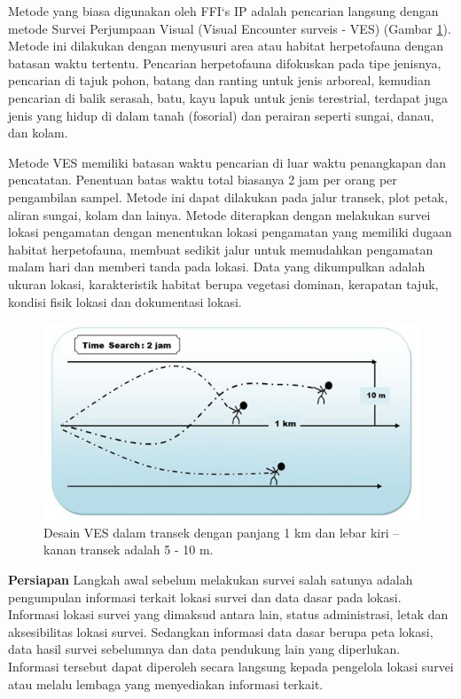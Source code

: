 \documentclass[
  oneside]{book}
\begin{document}
Metode yang biasa digunakan oleh FFI`s IP adalah pencarian langsung dengan metode Survei Perjumpaan Visual (Visual Encounter surveis - VES) (Gambar \ref{fig:figves}). Metode ini dilakukan dengan menyusuri area atau habitat herpetofauna dengan batasan waktu tertentu. Pencarian herpetofauna difokuskan pada tipe jenisnya, pencarian di tajuk pohon, batang dan ranting untuk jenis arboreal, kemudian pencarian di balik serasah, batu, kayu lapuk untuk jenis terestrial, terdapat juga jenis yang hidup di dalam tanah (fosorial) dan perairan seperti sungai, danau, dan kolam.

Metode VES memiliki batasan waktu pencarian di luar waktu penangkapan dan pencatatan. Penentuan batas waktu total biasanya 2 jam per orang per pengambilan sampel. Metode ini dapat dilakukan pada jalur transek, plot petak, aliran sungai, kolam dan lainya. Metode diterapkan dengan melakukan survei lokasi pengamatan dengan menentukan lokasi pengamatan yang memiliki dugaan habitat herpetofauna, membuat sedikit jalur untuk memudahkan pengamatan malam hari dan memberi tanda pada lokasi. Data yang dikumpulkan adalah ukuran lokasi, karakteristik habitat berupa vegetasi dominan, kerapatan tajuk, kondisi fisik lokasi dan dokumentasi lokasi.

\begin{figure}

{\centering \includegraphics[width=1\linewidth]{images/ves_ilustration} 

}

\caption{Desain VES dalam transek dengan panjang 1 km dan lebar kiri – kanan transek adalah 5 - 10 m.}\label{fig:figves}
\end{figure}

\textbf{Persiapan}
Langkah awal sebelum melakukan survei salah satunya adalah pengumpulan informasi terkait lokasi survei dan data dasar pada lokasi. Informasi lokasi survei yang dimaksud antara lain, status administrasi, letak dan aksesibilitas lokasi survei. Sedangkan informasi data dasar berupa peta lokasi, data hasil survei sebelumnya dan data pendukung lain yang diperlukan. Informasi tersebut dapat diperoleh secara langsung kepada pengelola lokasi survei atau melalu lembaga yang menyediakan informasi terkait.
\end{document}
